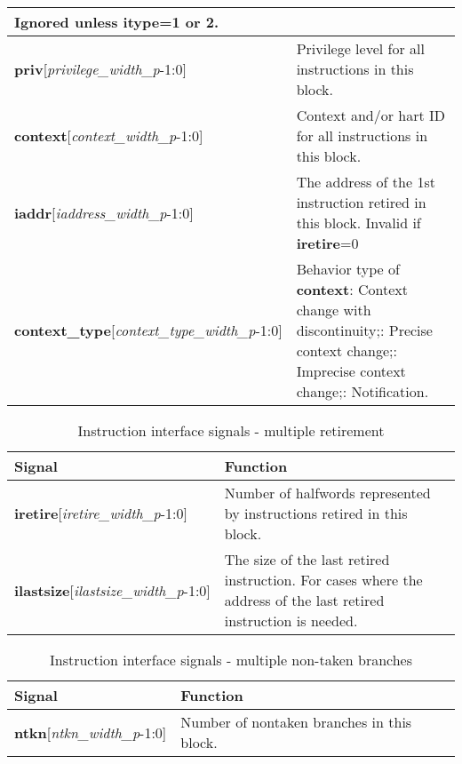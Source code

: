 \begin{table}[htp]
\begin{tabulary}{\textwidth}{|l|p{80mm}|}
    Ignored unless \textbf{itype}=1 or 2.\\
        \hline
        \textbf{priv}[\textit{privilege\_width\_p}-1:0] & Privilege level for all instructions in this block.\\
        \hline
        \textbf{context}[\textit{context\_width\_p}-1:0] & Context and/or hart ID for all instructions in this block.\\
        \hline
        \textbf{iaddr}[\textit{iaddress\_width\_p}-1:0] & The address of the 1st instruction retired in this block.\newline
        Invalid if \textbf{iretire}=0 \\
        \hline
        \textbf{context\_type}[\textit{context\_type\_width\_p}-1:0] & Behavior type of \textbf{context}: Context change with discontinuity;: Precise context change;: Imprecise context change;: Notification.\\
        \hline
    \end{tabulary}
\end{table}

\begin{table}[htp]
    \centering
    \caption{Instruction interface signals - multiple retirement}
    \label{tab:multi-ingress}
    \begin{tabulary}{\textwidth}{|l|p{80mm}|}
        \hline
        \textbf {Signal} & \textbf {Function} \\
        \hline
        \textbf{iretire}[\textit{iretire\_width\_p}-1:0] & Number of halfwords represented by instructions retired in this block.\\
        \hline
        \textbf{ilastsize}[\textit{ilastsize\_width\_p}-1:0] & The size of the last retired instruction. For cases where the address of the last retired instruction is needed.\\
        \hline
    \end{tabulary}
\end{table}

\begin{table}[htp]
    \centering
    \caption{Instruction interface signals - multiple non-taken branches}
    \label{tab:multintb-ingress}
    \begin{tabulary}{\textwidth}{|l|p{90mm}|}
        \hline
        \textbf {Signal} & \textbf {Function} \\
        \hline
        \textbf{ntkn}[\textit{ntkn\_width\_p}-1:0] & Number of nontaken branches in this block.\\
        \hline
    \end{tabulary}
\end{table}

